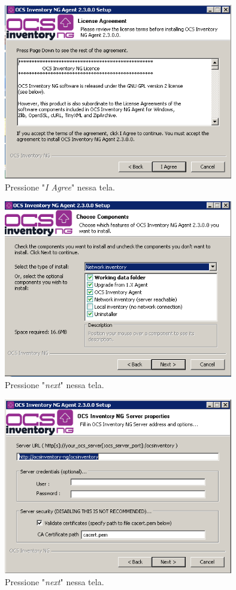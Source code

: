 \documentclass[
               12pt,             %
               a4paper,          %
               chapter=TITLE,    %
               section=TITLE,    %
               english,
               brazil            
]{article}
\begin{document}
\begin{figure}

	\center
	\includegraphics[width=10cm]{imagens/2.PNG}
	\caption{Pressione "\textit{I Agree}" nessa tela.}

\end{figure}

\begin{figure}
	
	\center
	\includegraphics[width=10cm]{imagens/3.PNG}
	\caption{Pressione "\textit{next}" nessa tela.}

\end{figure}

\begin{figure}
	
	\center
	\includegraphics[width=10cm]{imagens/4.PNG}
	\caption{Pressione "\textit{next}" nessa tela.}
	 
\end{figure}
\end{document}
